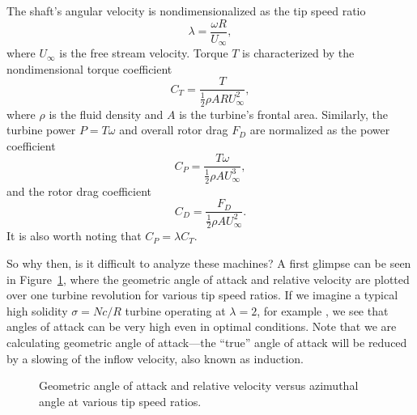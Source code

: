 The shaft's angular velocity is nondimensionalized as the tip speed ratio
\begin{equation}
\lambda = \frac{\omega R}{U_\infty},
\label{eq:lambda}
\end{equation}
where $U_\infty$ is the free stream velocity.
Torque $T$ is characterized by the nondimensional torque coefficient 
\begin{equation}
C_T = \frac{T}{\frac{1}{2} \rho A R U_\infty^2},
\label{eq:ct}
\end{equation}
where $\rho$ is the fluid density and $A$ is the turbine's frontal area.
Similarly, the turbine power $P = T\omega$ and overall rotor drag $F_D$ are
normalized as the power coefficient
\begin{equation}
C_P = \frac{T \omega}{\frac{1}{2} \rho A U_\infty^3},
\label{eq:cp}
\end{equation}
and the rotor drag coefficient
\begin{equation}
C_D = \frac{F_D}{\frac{1}{2} \rho A U_\infty^2}.
\label{eq:cd}
\end{equation}
It is also worth noting that $C_P = \lambda C_T$.

So why then, is it difficult to analyze these machines? A first glimpse can be
seen in Figure~\ref{fig:geom-alpha-urel}, where the geometric angle of attack
and relative velocity are plotted over one turbine revolution for various tip
speed ratios. If we imagine a typical high solidity $\sigma = Nc/R$ turbine
operating at $\lambda = 2$, for example \cite{Howell2010}, we see that angles of
attack can be very high even in optimal conditions. Note that we are calculating
geometric angle of attack---the ``true'' angle of attack will be reduced by a
slowing of the inflow velocity, also known as induction. 

\begin{figure}[ht]
    \caption{Geometric angle of attack and relative velocity versus azimuthal
        angle at various tip speed ratios.}
    
    \label{fig:geom-alpha-urel}
\end{figure}

